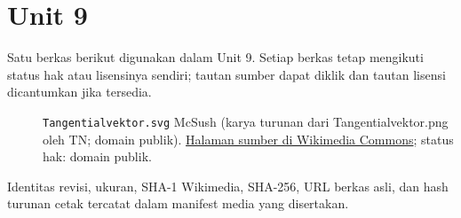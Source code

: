 \section*{Unit 9}
Satu berkas berikut digunakan dalam Unit 9. Setiap berkas tetap mengikuti status hak atau lisensinya sendiri; tautan sumber dapat diklik dan tautan lisensi dicantumkan jika tersedia.
\begin{description}
\item[]\texttt{Tangentialvektor.svg}
McSush (karya turunan dari Tangentialvektor.png oleh TN; domain publik).
\href{https://commons.wikimedia.org/wiki/File:Tangentialvektor.svg}{Halaman sumber di Wikimedia Commons}; status hak: domain publik.
\end{description}
Identitas revisi, ukuran, SHA-1 Wikimedia, SHA-256, URL berkas asli, dan hash turunan cetak tercatat dalam manifest media yang disertakan.
